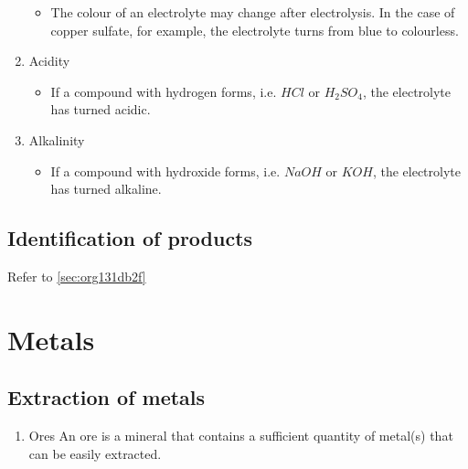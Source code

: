 \documentclass[11pt]{article}
\begin{document}
\begin{enumerate}
\begin{itemize}
\item The colour of an electrolyte may change after electrolysis. In the case of copper sulfate, for example, the electrolyte turns from blue to colourless.
\end{itemize}
\item Acidity
\begin{itemize}
\item If a compound with hydrogen forms, i.e. \(HCl\) or \(H_2SO_4\), the electrolyte has turned acidic.
\end{itemize}
\item Alkalinity
\begin{itemize}
\item If a compound with hydroxide forms, i.e. \(NaOH\) or \(KOH\), the electrolyte has turned alkaline.
\end{itemize}
\end{enumerate}
\subsection{Identification of products}
\label{sec:org3bcd6b7}
Refer to \ref{sec:org131db2f}
\section{Metals}
\label{sec:orgaba8250}
\subsection{Extraction of metals}
\label{sec:org256dfe0}
\begin{enumerate}
\item Ores
\label{sec:orgf203b7f}
An ore is a mineral that contains a sufficient quantity of metal(s) that can be easily extracted.
\end{enumerate}
\end{document}
